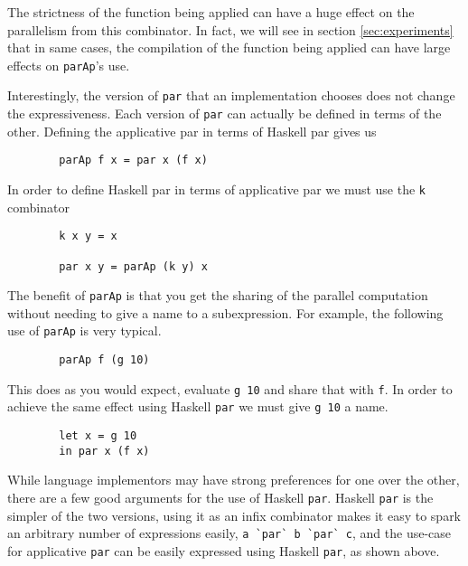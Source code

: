 The strictness of the function being applied can have a huge effect on the
parallelism from this combinator. In fact, we will see in section
\ref{sec:experiments} that in same cases, the compilation of the
function being applied can have large effects on \verb=parAp='s use.

Interestingly, the version of \verb=par= that an implementation chooses does
not change the expressiveness. Each version of \verb-par- can actually be
defined in terms of the other. Defining the applicative par in terms of Haskell
par gives us

\begin{verbatim}
        parAp f x = par x (f x)
\end{verbatim}

In order to define Haskell par in terms of applicative par we must use the
\verb=k= combinator

\begin{verbatim}
        k x y = x

        par x y = parAp (k y) x
\end{verbatim}

The benefit of \verb|parAp| is that you get the sharing of the parallel computation
without needing to give a name to a subexpression. For example, the following use of
\verb|parAp| is very typical.

\begin{verbatim}
        parAp f (g 10)
\end{verbatim}

This does as you would expect, evaluate \verb|g 10| and share that with
\verb|f|. In order to achieve the same effect using Haskell \verb|par| we must
give \verb|g 10| a name.

\begin{verbatim}
        let x = g 10
        in par x (f x)
\end{verbatim}


While language implementors may have strong preferences for one over the other,
there are a few good arguments for the use of Haskell \verb=par=. Haskell
\verb=par= is the simpler of the two versions, using it as an infix combinator
makes it easy to spark an arbitrary number of expressions easily,
\verb-a `par` b `par` c-, and the use-case for applicative \verb=par= can be easily
expressed using Haskell \verb|par|, as shown above.

